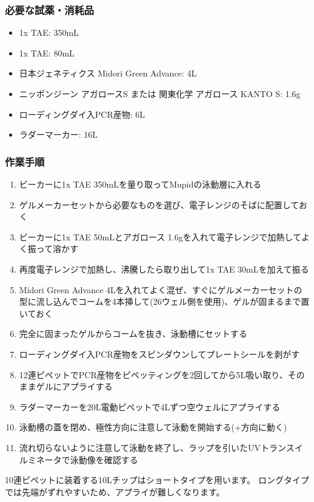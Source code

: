 \documentclass[titlepage,10pt,a4paper,uplatex]{jsbook}
\begin{document}
\subsubsection{必要な試薬・消耗品}
\begin{itemize}
\item 1x TAE: 350mL
\item 1x TAE: 80mL
\item 日本ジェネティクス Midori Green Advance: 4{\textmu}L
\item ニッポンジーン アガロースS または 関東化学 アガロース KANTO S: 1.6g
\item ローディングダイ入PCR産物: 6{\textmu}L
\item ラダーマーカー: 16{\textmu}L
\end{itemize}

\subsubsection{作業手順}
\begin{enumerate}
\item ビーカーに1x TAE 350mLを量り取ってMupidの泳動層に入れる
\item ゲルメーカーセットから必要なものを選び、電子レンジのそばに配置しておく
\item ビーカーに1x TAE 50mLとアガロース 1.6gを入れて電子レンジで加熱してよく振って溶かす
\item 再度電子レンジで加熱し、沸騰したら取り出して1x TAE 30mLを加えて振る
\item Midori Green Advance 4{\textmu}Lを入れてよく混ぜ、すぐにゲルメーカーセットの型に流し込んでコームを4本挿して(26ウェル側を使用)、ゲルが固まるまで置いておく
\item 完全に固まったゲルからコームを抜き、泳動槽にセットする
\item ローディングダイ入PCR産物をスピンダウンしてプレートシールを剥がす
\item 12連ピペットでPCR産物をピペッティングを2回してから5{\textmu}L吸い取り、そのままゲルにアプライする
\item ラダーマーカーを20{\textmu}L電動ピペットで4{\textmu}Lずつ空ウェルにアプライする
\item 泳動槽の蓋を閉め、極性方向に注意して泳動を開始する(+方向に動く)
\item 流れ切らないように注意して泳動を終了し、ラップを引いたUVトランスイルミネータで泳動像を確認する
\end{enumerate}

10連ピペットに装着する10{\textmu}Lチップはショートタイプを用います。
ロングタイプでは先端がずれやすいため、アプライが難しくなります。
\end{document}
